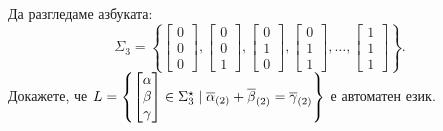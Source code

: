 \begin{problem}
  Да разгледаме азбуката:
  \[\Sigma_3 = \left\{\begin{bmatrix} 0\\0\\0\end{bmatrix},\begin{bmatrix} 0\\0\\1\end{bmatrix},\begin{bmatrix} 0\\1\\0\end{bmatrix},\begin{bmatrix} 0\\1\\1\end{bmatrix},\dots,\begin{bmatrix} 1\\1\\1\end{bmatrix}\right\}.\]
  Докажете, че 
  $L = \left\{\begin{bmatrix} \alpha\\\beta\\\gamma\end{bmatrix} \in \Sigma^\star_3 \mid \overline{\alpha}_{(2)}+\overline{\beta}_{(2)} = \overline{\gamma}_{(2)}\right\}$
  е автоматен език.
\end{problem}
\ifhints
